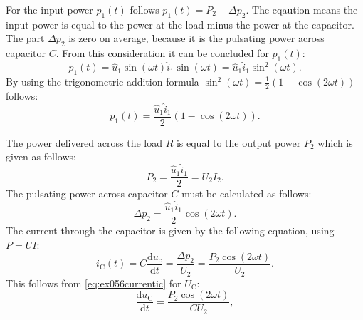 \begin{solutionblock}
    For the input power $p_\mathrm{1}(t)$ follows $p_\mathrm{1}(t)= P_\mathrm{2} -\Delta p_\mathrm{2}$. The eqaution means the input power is equal to the power at the load minus the power at the capacitor. The part $\Delta p_\mathrm{2}$ is zero on average, because it is the pulsating power across capacitor $C$. From this consideration it can be concluded for $p_\mathrm{1}(t)$:
    \begin{equation}
        p_\mathrm{1}(t) = \hat u_\mathrm{1} \sin(\omega t) \hat i_\mathrm{1} \sin(\omega t) = \hat u_\mathrm{1} \hat i_\mathrm{1} \sin^2(\omega t).
    \end{equation}
    By using the trigonometric addition formula $\sin^2(\omega t) = \frac{1}{2}(1-\cos(2\omega t))$ follows:
    \begin{equation}
        p_\mathrm{1}(t) = \frac{\hat u_\mathrm{1} \hat i_\mathrm{1}}{2}(1-\cos(2\omega t)).
    \end{equation}

    The power delivered across the load $R$ is equal to the output power $P_\mathrm{2}$ which is given as follows:
    \begin{equation}
        P_\mathrm{2} = \frac{\hat u_\mathrm{1}\hat i_\mathrm{1}}{2} = U_\mathrm{2} I_\mathrm{2}.
    \end{equation}
    The pulsating power across capacitor $C$ must be calculated as follows:
    \begin{equation}
        \Delta p_\mathrm{2} = \frac{\hat u_\mathrm{1}\hat i_\mathrm{1}}{2} \cos(2\omega t).
    \end{equation}
    The current through the capacitor is given by the following equation, using $P = UI$:
    \begin{equation}
        i_\mathrm{C}(t)=C \frac{\mathrm{d}u_\mathrm{c}}{\mathrm{d}t} = \frac{\Delta p_\mathrm{2}}{U_\mathrm{2}} = \frac{P_\mathrm{2}\cos(2\omega t)}{U_\mathrm{2}}.\label{eq:ex056currentic}
    \end{equation}
    This follows from \eqref{eq:ex056currentic} for $U_\mathrm{C}$:
    \begin{equation}
        \frac{\mathrm{d}u_\mathrm{C}}{\mathrm{d}t} = \frac{P_\mathrm{2}\cos (2\omega t)}{C U_\mathrm{2}},
    \end{equation}


\end{solutionblock}
